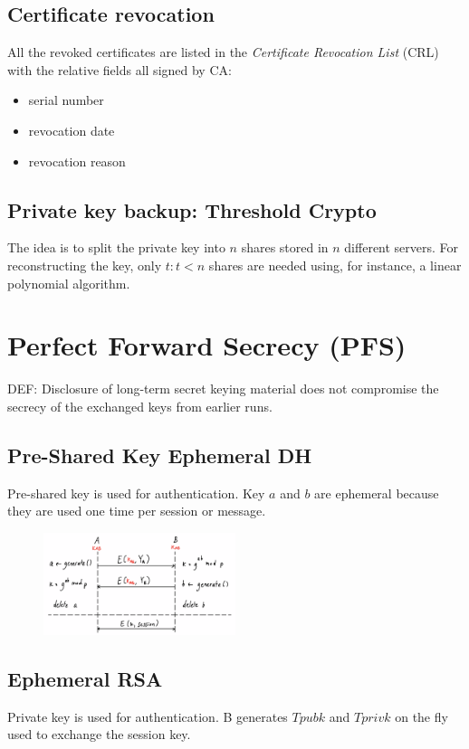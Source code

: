 \documentclass[a4paper,12pt]{article}
\begin{document}
\subsection{Certificate revocation}
All the revoked certificates are listed in the \textit{Certificate Revocation List} (CRL) with the relative fields all signed by CA:
\begin{itemize}
	\item serial number
	\item revocation date
	\item revocation reason
\end{itemize}

\subsection{Private key backup: Threshold Crypto}
The idea is to split the private key into $n$ shares stored in $n$ different servers.
For reconstructing the key, only $t : t < n$ shares are needed using, for instance, a linear polynomial algorithm.

\section{Perfect Forward Secrecy (PFS)}
DEF: Disclosure of long-term secret keying material does not compromise the secrecy of the exchanged keys from earlier runs.

\subsection{Pre-Shared Key Ephemeral DH}
Pre-shared key is used for authentication.
Key $a$ and $b$ are ephemeral because they are used one time per session or message.

\begin{figure}[H]
  \centering
  \includegraphics[width=0.5\textwidth]{img/psk-dhe}
\end{figure}

\subsection{Ephemeral RSA}
Private key is used for authentication.
B generates $Tpubk$ and $Tprivk$ on the fly used to exchange the session key.
\end{document}

